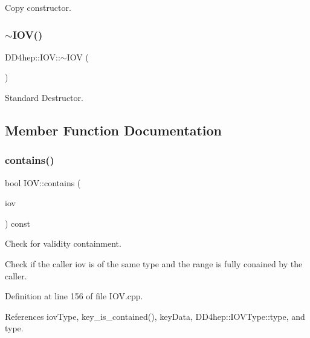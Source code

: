 Copy constructor. 

\hypertarget{class_d_d4hep_1_1_i_o_v_a16d2f34c37ff41d41fcefa6a04efad58}{}\label{class_d_d4hep_1_1_i_o_v_a16d2f34c37ff41d41fcefa6a04efad58} 
\subsubsection{\texorpdfstring{$\sim$\+I\+O\+V()}{~IOV()}}
{\footnotesize\ttfamily D\+D4hep\+::\+I\+O\+V\+::$\sim$\+I\+OV (\begin{DoxyParamCaption}{ }\end{DoxyParamCaption})\hspace{0.3cm}{\ttfamily [default]}}



Standard Destructor. 



\subsection{Member Function Documentation}
\hypertarget{class_d_d4hep_1_1_i_o_v_a5cd2623441069946551462e2d8a98174}{}\label{class_d_d4hep_1_1_i_o_v_a5cd2623441069946551462e2d8a98174} 
\subsubsection{\texorpdfstring{contains()}{contains()}}
{\footnotesize\ttfamily bool I\+O\+V\+::contains (\begin{DoxyParamCaption}\item[{const \hyperlink{class_d_d4hep_1_1_i_o_v}{I\+OV} \&}]{iov }\end{DoxyParamCaption}) const}



Check for validity containment. 

Check if the caller \textquotesingle{}iov\textquotesingle{} is of the same type and the range is fully conained by the caller. 

Definition at line 156 of file I\+O\+V.\+cpp.



References iov\+Type, key\+\_\+is\+\_\+contained(), key\+Data, D\+D4hep\+::\+I\+O\+V\+Type\+::type, and type.



